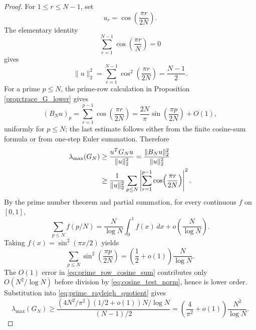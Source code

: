 \documentclass[11pt]{amsart}
\numberwithin{equation}{section}
\theoremstyle{plain}
\theoremstyle{definition}
\theoremstyle{remark}
\begin{document}
\begin{proof}
For $1\le r\le N-1$, set
\begin{equation}
u_r=\cos\!\left(\frac{\pi r}{2N}\right).
\label{eq:cosine_test_vector}
\end{equation}
The elementary identity
\begin{equation}
\sum_{r=1}^{N-1}\cos\!\left(\frac{\pi r}{N}\right)=0
\end{equation}
gives
\begin{equation}
\|u\|_2^2
=\sum_{r=1}^{N-1}\cos^2\!\left(\frac{\pi r}{2N}\right)
=\frac{N-1}{2}.
\label{eq:cosine_test_norm}
\end{equation}
For a prime $p\le N$, the prime-row calculation in Proposition \ref{prop:trace_G_lower} gives
\begin{equation}
(B_Nu)_p
=\sum_{r=1}^{p-1}\cos\!\left(\frac{\pi r}{2N}\right)
=\frac{2N}{\pi}\sin\!\left(\frac{\pi p}{2N}\right)+O(1),
\label{eq:prime_row_cosine_sum}
\end{equation}
uniformly for $p\le N$; the last estimate follows either from the finite cosine-sum formula or from one-step Euler summation.  Therefore
\begin{align}
\lambda_{\max}(G_N)
&\ge \frac{u^TG_Nu}{\|u\|_2^2}
=\frac{\|B_Nu\|_2^2}{\|u\|_2^2}\notag\\
&\ge
\frac{1}{\|u\|_2^2}
\sum_{p\le N}
\left|\sum_{r=1}^{p-1}\cos\!\left(\frac{\pi r}{2N}\right)\right|^2.
\label{eq:prime_rayleigh_quotient}
\end{align}
By the prime number theorem and partial summation, for every continuous $f$ on $[0,1]$,
\begin{equation}
\sum_{p\le N}f(p/N)
=\frac{N}{\log N}\int_0^1f(x)\,dx
+o\!\left(\frac{N}{\log N}\right).
\label{eq:weighted_pnt_riemann}
\end{equation}
Taking $f(x)=\sin^2(\pi x/2)$ yields
\begin{equation}
\sum_{p\le N}\sin^2\!\left(\frac{\pi p}{2N}\right)
=\left(\frac12+o(1)\right)\frac{N}{\log N}.
\label{eq:prime_sine_square_sum}
\end{equation}
The $O(1)$ error in \eqref{eq:prime_row_cosine_sum} contributes only $O(N^2/\log N)$ before division by \eqref{eq:cosine_test_norm}, hence is lower order.  Substitution into \eqref{eq:prime_rayleigh_quotient} gives
\begin{equation}
\lambda_{\max}(G_N)
\ge
\frac{(4N^2/\pi^2)(1/2+o(1))N/\log N}{(N-1)/2}
=
\left(\frac4{\pi^2}+o(1)\right)\frac{N^2}{\log N}.
\end{equation}
\end{proof}
\end{document}
